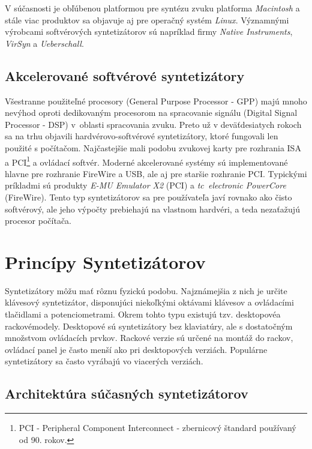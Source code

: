 V súčasnosti je obľúbenou platformou pre syntézu zvuku platforma \emph{Macintosh} a stále viac produktov sa objavuje aj pre operačný systém \emph{Linux}.
Významnými výrobcami softvérových syntetizátorov sú napríklad firmy \emph{Native Instruments}, \emph{VirSyn} a \emph{Ueberschall}.


\subsection{Akcelerované softvérové syntetizátory}

Všestranne použiteľné procesory (General Purpose Processor - GPP) majú mnoho nevýhod oproti dedikovaným procesorom na spracovanie signálu (Digital Signal Processor - DSP) v~oblasti spracovania zvuku.
Preto už v deväťdesiatych rokoch sa na trhu objavili hardvérovo-softvérové syntetizátory, ktoré fungovali len použité s počítačom. Najčastejšie mali podobu zvukovej karty pre rozhrania ISA a PCI\footnote{PCI - Peripheral Component Interconnect - zbernicový štandard používaný od 90. rokov.} a ovládací softvér. Moderné akcelerované systémy sú implementované hlavne pre rozhranie FireWire a USB, ale aj pre staršie rozhranie PCI. Typickými príkladmi sú produkty \emph{E-MU Emulator X2} (PCI) a \emph{tc~electronic PowerCore} (FireWire). Tento typ syntetizátorov sa pre používateľa javí rovnako ako čisto softvérový, ale jeho výpočty prebiehajú na vlastnom hardvéri, a teda nezaťažujú procesor počítača.

\section{Princípy Syntetizátorov}

Syntetizátory môžu mať rôznu fyzickú podobu. Najznámejšia z nich je určite klávesový syntetizátor, disponujúci niekoľkými oktávami klávesov a ovládacími tlačidlami a potenciometrami. Okrem tohto typu existujú tzv. \bq desktopové\eq a \bq rackové\eq modely. Desktopové sú syntetizátory bez klaviatúry, ale s dostatočným množstvom ovládacích prvkov. Rackové verzie sú určené na montáž do rackov, ovládací panel je často menší ako pri desktopových verziách. Populárne syntetizátory sa často vyrábajú vo viacerých verziách.

\subsection{Architektúra súčasných syntetizátorov}

